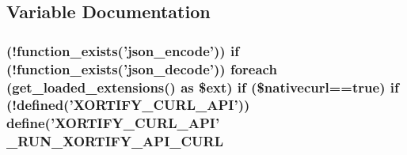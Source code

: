 \subsection{Variable Documentation}
\hypertarget{curl_8php_a1a0cd15bcec96ef5aa5c4451f95062bb}{
\subsubsection[{\-\_\-\-R\-U\-N\-\_\-\-X\-O\-R\-T\-I\-F\-Y\-\_\-\-A\-P\-I\-\_\-\-C\-U\-R\-L}]{ (!function\-\_\-exists('json\-\_\-encode')) {\bf if} (!function\-\_\-exists('json\-\_\-decode')) foreach (get\-\_\-loaded\-\_\-extensions() as \$ext) {\bf if} (\$nativecurl==true) {\bf if} (!defined('X\-O\-R\-T\-I\-F\-Y\-\_\-\-C\-U\-R\-L\-\_\-\-A\-P\-I')) define('X\-O\-R\-T\-I\-F\-Y\-\_\-\-C\-U\-R\-L\-\_\-\-A\-P\-I' \-\_\-\-R\-U\-N\-\_\-\-X\-O\-R\-T\-I\-F\-Y\-\_\-\-A\-P\-I\-\_\-\-C\-U\-R\-L}}\label{curl_8php_a1a0cd15bcec96ef5aa5c4451f95062bb}
